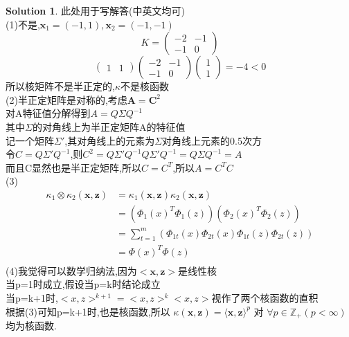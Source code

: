 \documentclass[a4paper,UTF8]{article}
\numberwithin{equation}{section}
\theoremstyle{definition}
\newtheorem*{solution}{Solution}
\def \A {\mathbf{A}}
\def \C {\mathbf{C}}
\def \x {\mathbf{x}}
\def \z {\mathbf{z}}
\begin{document}
\begin{solution}
此处用于写解答(中英文均可)
~\\
(1)不是,$\x_1=(-1,1),\x_2=(-1,-1)$\\
$$
K=\begin{pmatrix}
	-2&-1\\
	-1&0
\end{pmatrix}
$$
$$
\begin{pmatrix}
	1&1
\end{pmatrix}
\begin{pmatrix}
	-2&-1\\
	-1&0
\end{pmatrix}
\begin{pmatrix}
	1\\
	1
\end{pmatrix}=-4<0
$$
所以核矩阵不是半正定的,$\kappa$不是核函数\\
(2)半正定矩阵是对称的,考虑$\A=\C ^2$\\
对A特征值分解得到$A=Q\Sigma Q^{-1}$\\
其中$\Sigma$的对角线上为半正定矩阵A的特征值\\
记一个矩阵$\Sigma'$,其对角线上的元素为$\Sigma$对角线上元素的0.5次方\\
令$C=Q\Sigma' Q^{-1}$,则$C^2=Q\Sigma' Q^{-1}Q\Sigma' Q^{-1}=Q\Sigma Q^{-1}=A$\\
而且C显然也是半正定矩阵,所以$C=C^T$,所以$A=C^T C$\\
(3)
\begin{align*}
\kappa_1 \otimes \kappa_2(\x, \z)&=\kappa_1(\x, \z) \kappa_2(\x, \z)\\
&=(\Phi_1 (x)^T \Phi_1 (z))(\Phi_2 (x)^T \Phi_2 (z))\\
&=\sum_{t=1}^{m}(\Phi_{1t}(x)\Phi_{2t}(x)\Phi_{1t}(z)\Phi_{2t}(z))\\
&=\Phi(x)^T\Phi(z)\\
\end{align*}
(4)我觉得可以数学归纳法,因为$<\x,\z>$是线性核\\
当p=1时成立,假设当p=k时结论成立\\
当p=k+1时,$<x,z>^{k+1}=<x,z>^{k} <x,z>$视作了两个核函数的直积\\
根据(3)可知p=k+1时,也是核函数,所以 $\kappa(\x, \z) = \langle\x, \z\rangle^p$ 对 $\forall p\in\mathbb{Z}_+(p<\infty)$ 均为核函数.
\end{solution}
\end{document}
